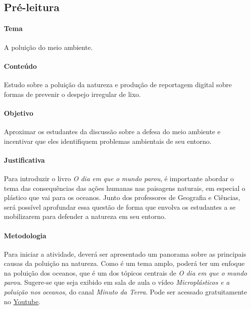 \documentclass[11pt]{extarticle}
\begin{document}
\subsection{Pré-leitura}


\paragraph{Tema} A poluição do meio ambiente.

\paragraph{Conteúdo} Estudo sobre a poluição da natureza e produção de reportagem digital sobre formas de prevenir o despejo irregular de lixo.

\paragraph{Objetivo} Aproximar os estudantes da discussão sobre a defesa do meio ambiente e incentivar que eles identifiquem problemas ambientais de seu entorno. 


\paragraph{Justificativa} Para introduzir o livro \textit{O dia em que o mundo parou}, é importante abordar o tema das consequências das ações humanas nas paisagens naturais, em especial o plástico que vai para os oceanos. Junto dos professores de Geografia e Ciências, será possível aprofundar essa questão de forma que envolva os estudantes a se mobilizarem para defender a natureza em seu entorno.

\paragraph{Metodologia} Para iniciar a atividade, deverá ser apresentado um panorama sobre as principais causas da poluição na natureza. Como é um tema amplo, poderá ter um enfoque na poluição dos oceanos, que é um dos tópicos centrais de \textit{O dia em que o mundo parou}. Sugere-se que seja exibido em sala de aula o vídeo \textit{Microplásticos e a poluição nos oceanos}, do canal \textit{Minuto da Terra}. Pode ser acessado gratuitamente no \href{https://youtu.be/adc0cOqE4qs}{Youtube}. 
\end{document}
